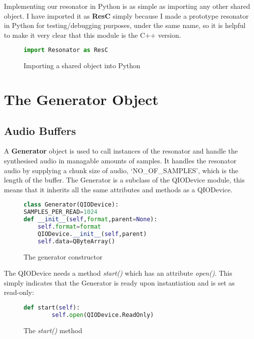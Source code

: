 \documentclass{article}
\begin{document}
Implementing our resonator in Python is as simple as importing any other shared object. I have imported it as \textbf{ResC} simply because I made a prototype resonator in Python for testing/debugging purposes, under the same name, so it is helpful to make it very clear that this module is the C++ version.
 \begin{figure}[H]
 	\begin{lstlisting}[language=python]
import Resonator as ResC
 	\end{lstlisting}
 	\caption{Importing a shared object into Python}
 	\end{figure}
 
\section{The Generator Object} 
\subsection{Audio Buffers}
A \textbf{Generator} object is used to call instances of the resonator and handle the synthesised audio in managable amounts of samples. It handles the resonator audio by supplying a chunk size of audio, `NO\_OF\_SAMPLES', which is the length of the buffer. The Generator is a subclass of the QIODevice module, this means that it inherits all the same attributes and methods as a QIODevice.

 \begin{figure}[H]
	\begin{lstlisting}[language=python]
class Generator(QIODevice):
SAMPLES_PER_READ=1024
def __init__(self,format,parent=None):
	self.format=format
	QIODevice.__init__(self,parent)
	self.data=QByteArray()
	\end{lstlisting}
	\caption{The generator constructor}
\end{figure}

The QIODevice needs a method \textit{start()} which has an attribute \textit{open()}. This simply indicates that the Generator is ready upon instantiation and is set as read-only:

 \begin{figure}[H]
	\begin{lstlisting}[language=python]
    def start(self):
		self.open(QIODevice.ReadOnly)

	\end{lstlisting}
	\caption{The \textit{start()} method}
\end{figure}
\end{document}
